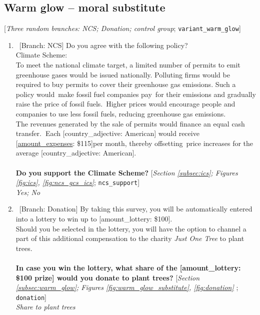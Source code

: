 \documentclass[12pt,english]{article}
\begin{document}
\begin{bibunit}
 \subsection*{Warm glow -- moral substitute} 
 [\textit{Three random branches: NCS; Donation; control group};  \verb|variant_warm_glow|] 
 \begin{enumerate}[resume] 
\item ~[Branch: NCS] \label{q:ncs_support} Do you agree with the following policy?
~\\
Climate Scheme:~\\
To meet the national climate target, a limited number of permits to emit greenhouse gases would be issued nationally. Polluting firms would be required to buy permits to cover their greenhouse gas emissions. Such a policy would~make fossil fuel companies pay~for their emissions and gradually raise the price of fossil fuels.~Higher prices would encourage people and companies to use less fossil fuels, reducing greenhouse gas emissions.\\
The revenues generated by the sale of permits would finance an equal cash transfer.\textbf{~}Each [country\_adjective: American] would receive [\hyperlink{tab_features}{amount\_expenses}: \$115]per month, thereby offsetting~price increases for the average [country\_adjective: American].\\ 
~\\
\textbf{Do you support the Climate Scheme?} [\textit{Section \ref{subsec:ics}; Figures \ref{fig:ics}, \ref{fig:ncs_gcs_ics}}; 
\verb|ncs_support|]
  \\ \textit{Yes; No}

\item ~[Branch: Donation] \label{q:donation} By taking this survey, you will be automatically entered into a lottery to win up to [amount\_lottery: \$100]. \\Should you be selected in the lottery, you will have the option to channel a part of this additional compensation to the charity \textit{Just One Tree} to plant trees.\\\\\textbf{In case you win the lottery, what share of the [amount\_lottery: \$100 prize] would you donate to plant trees?} [\textit{Section \ref{subsec:warm_glow}; Figures \ref{fig:warm_glow_substitute}, \ref{fig:donation}
}; 
\verb|donation|]
  \\ \textit{Share to plant trees}

\end{enumerate} 


\end{bibunit}
\end{document}
